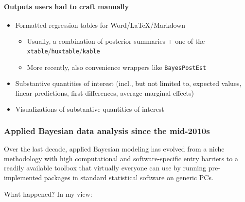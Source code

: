 \documentclass[
  11pt,
]{article}
\providecommand{\tightlist}{%
  \setlength{\itemsep}{0pt}\setlength{\parskip}{0pt}}
\begin{document}
\hypertarget{outputs-users-had-to-craft-manually-1}{%
\paragraph{Outputs users had to craft manually}\label{outputs-users-had-to-craft-manually-1}}

\begin{itemize}
\tightlist
\item
  Formatted regression tables for Word/LaTeX/Markdown

  \begin{itemize}
  \tightlist
  \item
    Usually, a combination of posterior summaries + one of the \texttt{xtable}/\texttt{huxtable}/\texttt{kable}
  \item
    More recently, also convenience wrappers like \texttt{BayesPostEst}
  \end{itemize}
\item
  Substantive quantities of interest (incl., but not limited to, expected values, linear predictions, first differences, average marginal effects)
\item
  Visualizations of substantive quantities of interest
\end{itemize}

\hypertarget{applied-bayesian-data-analysis-since-the-mid-2010s}{%
\subsubsection{Applied Bayesian data analysis since the mid-2010s}\label{applied-bayesian-data-analysis-since-the-mid-2010s}}

Over the last decade, applied Bayesian modeling has evolved from a niche methodology with high computational and software-specific entry barriers to a readily available toolbox that virtually everyone can use by running pre-implemented packages in standard statistical software on generic PCs.

What happened? In my view:
\end{document}
